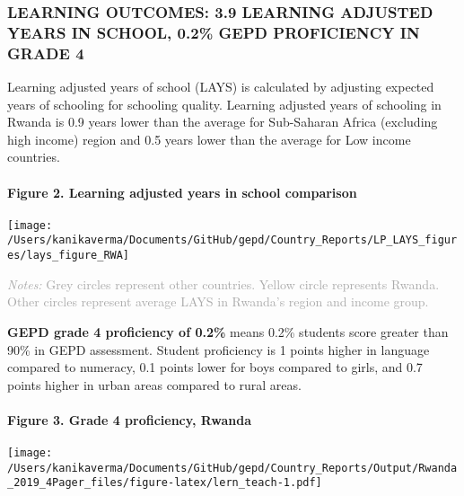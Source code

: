 \documentclass[
  twocolumn]{article}
\begin{document}
\hypertarget{learning-outcomes-3.9-learning-adjusted-years-in-school-0.2-gepd-proficiency-in-grade-4}{%
\subsubsection{\texorpdfstring{\textbf{LEARNING OUTCOMES: 3.9 LEARNING
ADJUSTED YEARS IN SCHOOL, 0.2\% GEPD PROFICIENCY IN GRADE
4}}{LEARNING OUTCOMES: 3.9 LEARNING ADJUSTED YEARS IN SCHOOL, 0.2\% GEPD PROFICIENCY IN GRADE 4}}\label{learning-outcomes-3.9-learning-adjusted-years-in-school-0.2-gepd-proficiency-in-grade-4}}

Learning adjusted years of school (LAYS) is calculated by adjusting
expected years of schooling for schooling quality. Learning adjusted
years of schooling in Rwanda is 0.9 years lower than the average for
Sub-Saharan Africa (excluding high income) region and 0.5 years lower
than the average for Low income countries.

\hypertarget{figure-2.-learning-adjusted-years-in-school-comparison}{%
\paragraph{Figure 2. Learning adjusted years in school
comparison}\label{figure-2.-learning-adjusted-years-in-school-comparison}}

\texttt{[image: /Users/kanikaverma/Documents/GitHub/gepd/Country\_Reports/LP\_LAYS\_figures/lays\_figure\_RWA]}

{\scriptsize
    \textcolor{darkgray}{\textit{Notes:} Grey circles represent other countries. Yellow circle represents Rwanda. Other circles represent average LAYS in Rwanda's region and income group.}
  }

\textbf{GEPD grade 4 proficiency of 0.2\%} means 0.2\% students score
greater than 90\% in GEPD assessment. Student proficiency is 1 points
higher in language compared to numeracy, 0.1 points lower for boys
compared to girls, and 0.7 points higher in urban areas compared to
rural areas. \vfill\null

\hypertarget{figure-3.-grade-4-proficiency-rwanda}{%
\paragraph{Figure 3. Grade 4 proficiency,
Rwanda}\label{figure-3.-grade-4-proficiency-rwanda}}

\texttt{[image: /Users/kanikaverma/Documents/GitHub/gepd/Country\_Reports/Output/Rwanda\_2019\_4Pager\_files/figure-latex/lern\_teach-1.pdf]}
\end{document}
